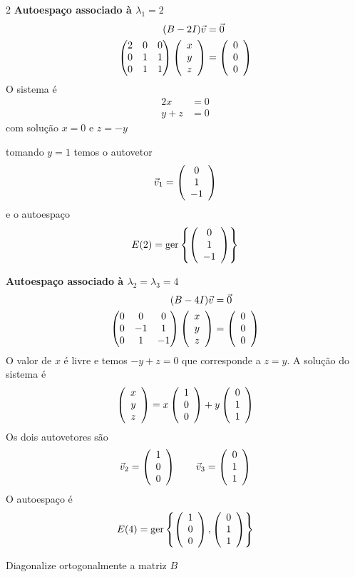 \documentclass[a4paper,12pt,fleqn]{article}
\begin{document}
\begin{answer}
\begin{multicols}{2}
\textbf{Autoespaço associado à $\lambda_1=2$}
  \begin{align*}
    (B-2I)\vec{v} & = \vec{0} \\
    \begin{pmatrix}
      2 & 0 & 0 \\
      0 & 1 & 1 \\
      0 & 1 & 1
    \end{pmatrix}
    \left(\begin{array}{c} x \\ y \\ z \end{array}\right) & = \left(\begin{array}{c} 0 \\ 0 \\ 0 \end{array}\right)
  \end{align*}
  O sistema é
  \begin{align*}
    2x  & = 0 \\
    y+z & = 0
  \end{align*}
  com solução
  \(
    x=0
  \) e
  \(
    z=-y
  \)

  tomando $y=1$ temos o autovetor
  \[
    \vec{v}_1 = \left(\begin{array}{c} 0 \\ 1 \\ -1 \end{array}\right)
  \]
  e o autoespaço
  \[
    E(2) = \operatorname{ger} \left\{ \left(\begin{array}{c} 0 \\ 1 \\ -1 \end{array}\right) \right\}
  \]

\bigskip
\textbf{Autoespaço associado à $\lambda_2=\lambda_3=4$}
  \begin{align*}
    (B-4I)\vec{v} & = \vec{0} \\
    \begin{pmatrix}
      0 & 0  & 0  \\
      0 & -1 & 1  \\
      0 & 1  & -1
    \end{pmatrix}
    \left(\begin{array}{c} x \\ y \\ z \end{array}\right) & = \left(\begin{array}{c} 0 \\ 0 \\ 0 \end{array}\right)
  \end{align*}
  O valor de $x$ é livre e temos
  \(
    -y + z = 0
  \) que corresponde a
  \(
    z = y
  \).
  A solução do sistema é
  \[
    \left(\begin{array}{c} x \\ y \\ z \end{array}\right)
    = x \left(\begin{array}{c} 1 \\ 0 \\ 0 \end{array}\right)
    + y \left(\begin{array}{c} 0 \\ 1 \\ 1 \end{array}\right)
  \]
  Os dois autovetores são
  \[
    \vec{v}_2 = \left(\begin{array}{c} 1 \\ 0 \\ 0 \end{array}\right) \qquad
    \vec{v}_3 = \left(\begin{array}{c} 0 \\ 1 \\ 1 \end{array}\right)
  \]
  O autoespaço é
  \[
    E(4) = \operatorname{ger} \left\{ \left(\begin{array}{c} 1 \\ 0 \\ 0 \end{array}\right), \left(\begin{array}{c} 0 \\ 1 \\ 1 \end{array}\right) \right\}
  \]
\end{multicols}
\end{answer}

Diagonalize ortogonalmente a matriz $B$
\end{document}
